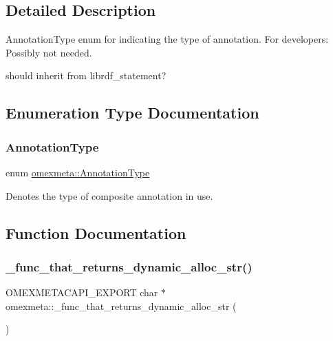 \subsection{Detailed Description}
Annotation\+Type enum for indicating the type of annotation. For developers\+: Possibly not needed.

should inherit from librdf\+\_\+statement? 

\subsection{Enumeration Type Documentation}
\mbox{\label{namespaceomexmeta_a1129ebb8a92218ebb27b9c76ac8462f7}} 
\subsubsection{\texorpdfstring{Annotation\+Type}{AnnotationType}}
{\footnotesize\ttfamily enum \hyperlink{namespaceomexmeta_a1129ebb8a92218ebb27b9c76ac8462f7}{omexmeta\+::\+Annotation\+Type}}

Denotes the type of composite annotation in use. 

\subsection{Function Documentation}
\mbox{\label{namespaceomexmeta_a1d7bca5e4a24d7482048bd28d901e502}} 
\subsubsection{\texorpdfstring{\+\_\+func\+\_\+that\+\_\+returns\+\_\+dynamic\+\_\+alloc\+\_\+str()}{\_func\_that\_returns\_dynamic\_alloc\_str()}}
{\footnotesize\ttfamily O\+M\+E\+X\+M\+E\+T\+A\+C\+A\+P\+I\+\_\+\+E\+X\+P\+O\+RT char $\ast$ omexmeta\+::\+\_\+func\+\_\+that\+\_\+returns\+\_\+dynamic\+\_\+alloc\+\_\+str (\begin{DoxyParamCaption}{ }\end{DoxyParamCaption})}

